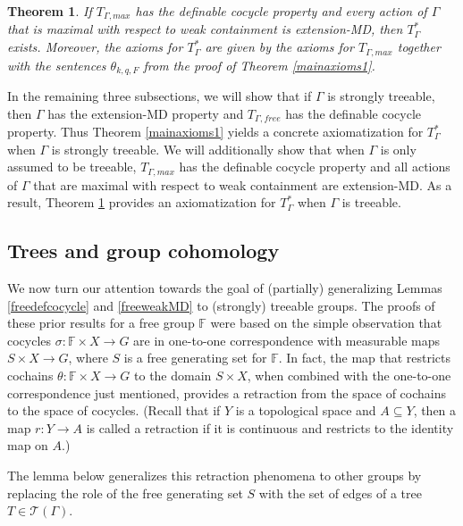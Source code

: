 \documentclass[12pt]{amsart}
\newtheorem{thm}{Theorem}[section]
\theoremstyle{definition}
\def\bb{\mathbb}
\def\bb{\mathbb}
\def\cal{\mathcal}
\begin{document}
\begin{thm}\label{mainaxioms2}
If $T_{\Gamma,max}$ has the definable cocycle property and every action of $\Gamma$ that is maximal with respect to weak containment is extension-MD, then $T_\Gamma^*$ exists.  Moreover, the axioms for $T_{\Gamma}^*$ are given by the axioms for $T_{\Gamma,max}$ together with the sentences $\theta_{k,q,F}$ from the proof of Theorem \ref{mainaxioms1}.
\end{thm}

In the remaining three subsections, we will show that if $\Gamma$ is strongly treeable, then $\Gamma$ has the extension-MD property and $T_{\Gamma, free}$ has the definable cocycle property. Thus Theorem \ref{mainaxioms1} yields a concrete axiomatization for $T_\Gamma^*$ when $\Gamma$ is strongly treeable. We will additionally show that when $\Gamma$ is only assumed to be treeable, $T_{\Gamma, max}$ has the definable cocycle property and all actions of $\Gamma$ that are maximal with respect to weak containment are extension-MD. As a result, Theorem \ref{mainaxioms2} provides an axiomatization for $T_\Gamma^*$ when $\Gamma$ is treeable.

\subsection{Trees and group cohomology}\label{subs:groupcoh}

We now turn our attention towards the goal of (partially) generalizing Lemmas \ref{freedefcocycle} and \ref{freeweakMD} to (strongly) treeable groups. The proofs of these prior results for a free group $\bb F$ were based on the simple observation that cocycles $\sigma : \bb F \times X \rightarrow G$ are in one-to-one correspondence with measurable maps $S \times X \rightarrow G$, where $S$ is a free generating set for $\bb F$. In fact, the map that restricts cochains $\theta : \bb F \times X \rightarrow G$ to the domain $S \times X$, when combined with the one-to-one correspondence just mentioned, provides a retraction from the space of cochains to the space of cocycles. (Recall that if $Y$ is a topological space and $A \subseteq Y$, then a map $r : Y \rightarrow A$ is called a retraction if it is continuous and restricts to the identity map on $A$.)

The lemma below generalizes this retraction phenomena to other groups by replacing the role of the free generating set $S$ with the set of edges of a tree $T \in \cal T(\Gamma)$.
\end{document}
